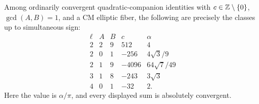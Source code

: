 \begin{proposition}
\label{prop:quad-extra-five}
Among ordinarily convergent quadratic-companion identities with
$c\in\mathbb Z\setminus\{0\}$, $\gcd(A,B)=1$, and a CM elliptic fiber,
the following are precisely the classes up to simultaneous sign:
\[
\begin{array}{c|rrr|l}
 \ell&A&B&c&\alpha\\\hline
 2&2&9&512&4\\
 2&0&1&-256&4\sqrt3/9\\
 2&1&9&-4096&64\sqrt7/49\\
 3&1&8&-243&3\sqrt3\\
 4&0&1&-32&2.
\end{array}
\]
Here the value is $\alpha/\pi$, and every displayed sum is absolutely
convergent.
\end{proposition}
